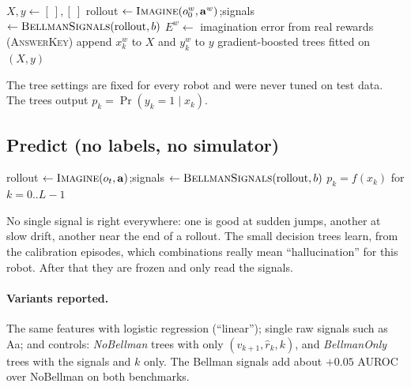 \documentclass[11pt]{article}
\begin{document}
\begin{algorithm}[h]
\caption{\textsc{FitTrees}}\label{alg:fit}
\begin{algorithmic}[1]
\State $X,y\gets[\ ],[\ ]$
  \State rollout $\gets\textsc{Imagine}(o^w_0,\mathbf a^w)$;\quad signals $\gets\textsc{BellmanSignals}(\text{rollout},b)$ 
  \State $E^w\gets$ imagination error from real rewards (\textsc{AnswerKey}) 
     \State append $x^w_k$ to $X$ and $y^w_k$ to $y$ \EndIf
  \EndFor
\EndFor
\State \Return gradient-boosted trees fitted on $(X,y)$ 
\end{algorithmic}
\end{algorithm}

The tree settings are fixed for every robot and were never tuned on test data. The trees output
$p_k=\Pr(y_k=1\mid x_k)$.

\subsection{Predict (no labels, no simulator)}

\begin{algorithm}[h]
\caption{\textsc{Detect}$(f,b,o_t,\mathbf a)$}\label{alg:detect}
\begin{algorithmic}[1]
\State rollout $\gets\textsc{Imagine}(o_t,\mathbf a)$;\quad signals $\gets\textsc{BellmanSignals}(\text{rollout},b)$ 
\State \Return $p_k=f(x_k)$ for $k=0..L-1$ 
\end{algorithmic}
\end{algorithm}

\begin{inwords}
No single signal is right everywhere: one is good at sudden jumps, another at slow drift, another near the end of a
rollout. The small decision trees learn, from the calibration episodes, which combinations really mean
``hallucination'' for this robot. After that they are frozen and only read the signals.
\end{inwords}

\paragraph{Variants reported.} The same features with logistic regression (``linear''); single raw signals such as
Aa; and controls: \emph{NoBellman} trees with only $(v_{k+1},\hat r_k,k)$, and \emph{BellmanOnly} trees with the
signals and $k$ only. The Bellman signals add about $+0.05$ AUROC over NoBellman on both benchmarks.
\end{document}
